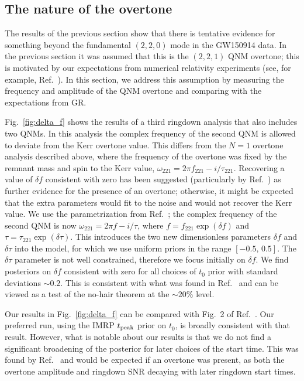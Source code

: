 \subsection{The nature of the overtone}\label{subsec:verify}

The results of the previous section show that there is tentative evidence for something beyond the fundamental $(2,2,0)$ mode in the GW150914 data. 
In the previous section it was assumed that this is the $(2,2,1)$ QNM overtone; this is motivated by our expectations from numerical relativity experiments (see, for example, Ref.~\cite{Giesler:2019uxc}). 
In this section, we address this assumption by measuring the frequency and amplitude of the QNM overtone and comparing with the expectations from GR.

Fig.~\ref{fig:delta_f} shows the results of a third ringdown analysis that also includes two QNMs.
In this analysis the complex frequency of the second QNM is allowed to deviate from the Kerr overtone value. 
This differs from the $N=1$ overtone analysis described above, where the frequency of the overtone was fixed by the remnant mass and spin to the Kerr value, $\omega_{221} = 2\pi f_{221} - i/\tau_{221}$.
Recovering a value of $\delta f$ consistent with zero has been suggested (particularly by Ref.~\cite{Isi:2022mhy}) as further evidence for the presence of an overtone; otherwise, it might be expected that the extra parameters would fit to the noise and would not recover the Kerr value.
We use the parametrization from Ref.~\cite{Isi:2022mhy}; the complex frequency of the second QNM is now $\omega_{221} = 2\pi f-i/\tau$, where $f=f_{221}\exp(\delta f)$ and $\tau=\tau_{221}\exp(\delta \tau)$. 
This introduces the two new dimensionless parameters $\delta f$ and $\delta \tau$ into the model, for which we use uniform priors in the range $[-0.5,\, 0.5]$.
The $\delta \tau$ parameter is not well constrained, therefore we focus initially on $\delta f$.
We find posteriors on $\delta f$ consistent with zero for all choices of $t_0$ prior with standard deviations $\sim 0.2$. 
This is consistent with what was found in Ref.~\cite{Isi:2019aib} and can be viewed as a test of the no-hair theorem at the $\sim 20\%$ level.

Our results in Fig.~\ref{fig:delta_f} can be compared with Fig.~2 of Ref.~\cite{Isi:2022mhy}. 
Our preferred run, using the IMRP $t_{\rm peak}$ prior on $t_0$, is broadly consistent with that result.
However, what is notable about our results is that we do not find a significant broadening of the posterior for later choices of the start time. 
This was found by Ref.~\cite{Isi:2022mhy} and would be expected if an overtone was present, as both the overtone amplitude and ringdown SNR decaying with later ringdown start times.

